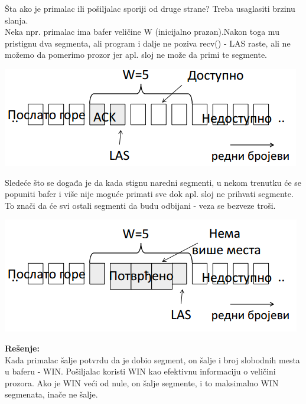\documentclass{article} %
\begin{document}
Šta ako je primalac ili pošiljalac sporiji od druge strane? Treba usaglasiti brzinu slanja. \\

Neka npr. primalac ima bafer veličine W (inicijalno prazan).Nakon toga mu pristignu dva segmenta, ali program i dalje ne poziva recv() - LAS raste, ali ne možemo da pomerimo prozor jer apl. sloj ne može da primi te segmente.
 \begin{center}
	\includegraphics[scale=0.5]{kontoka}
\end{center}
Sledeće što se događa je da kada stignu naredni segmenti, u nekom trenutku će se popuniti bafer i više nije moguće primati sve dok apl. sloj ne prihvati segmente. To znači da će svi ostali segmenti da budu odbijani - veza se bezveze troši.
 \begin{center}
	\includegraphics[scale=0.5]{kontoka1}
\end{center}
\textbf{Rešenje:}\\
Kada primalac šalje potvrdu da je dobio segment, on šalje i broj slobodnih mesta u baferu - WIN. Pošiljalac koristi WIN kao efektivnu informaciju o veličini prozora. Ako je WIN veći od nule, on šalje segmente, i to maksimalno WIN segmenata, inače ne šalje.\\
\end{document}
